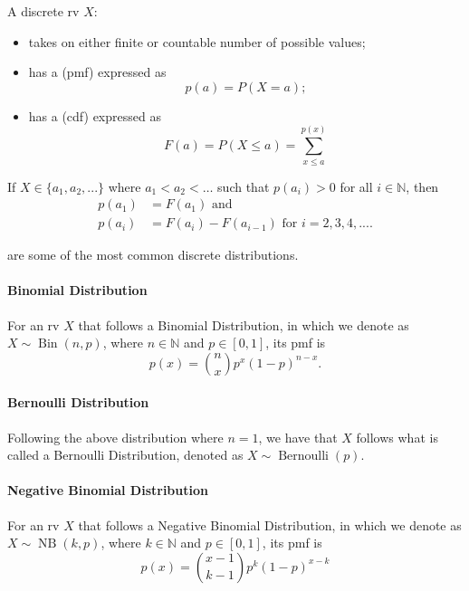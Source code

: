 \documentclass[notoc,notitlepage]{tufte-book}
\DeclareMathOperator{\Bernoulli}{Bernoulli }
\DeclareMathOperator{\Bin}{Bin }
\DeclareMathOperator{\NB}{NB }
\begin{document}

A discrete rv $X$:
\begin{itemize}
  \item takes on either finite or countable number of possible values;
  \item has a  (pmf) expressed as
    \begin{equation*}
      p(a) = P(X = a);
    \end{equation*}
  \item has a  (cdf) expressed as
    \begin{equation*}
      F(a) = P(X \leq a) = \sum_{x \leq a}^{p(x)} 
    \end{equation*}
\end{itemize}

\begin{note}
  If $X \in \{a_1, a_2, ...\}$ where $a_1 < a_2 < \hdots$ such that $p(a_i) > 0$ for all $i \in \mathbb{N}$, then
  \begin{align*}
    p(a_1) &= F(a_1) \text{ and } \\
    p(a_i) &= F(a_i) - F(a_{i - 1}) \text{ for } i = 2, 3, 4, ....
  \end{align*}
\end{note}

 are some of the most common discrete distributions.

\paragraph{Binomial Distribution} For an rv $X$ that follows a Binomial Distribution, in which we denote as $X \sim \Bin(n, p)$, where $n \in \mathbb{N}$ and $p \in [0, 1]$, its pmf is
\begin{equation*}
  p(x) = \binom{n}{x} p^x (1 - p)^{n - x}.
\end{equation*}

\paragraph{Bernoulli Distribution} Following the above distribution where $n = 1$, we have that $X$ follows what is called a Bernoulli Distribution, denoted as $X \sim \Bernoulli(p)$.

\paragraph{Negative Binomial Distribution} For an rv $X$ that follows a Negative Binomial Distribution, in which we denote as $X \sim \NB(k, p)$, where $k \in \mathbb{N}$ and $p \in [0, 1]$, its pmf is
\begin{equation*}
  p(x) = \binom{x - 1}{k - 1} p^k (1 - p)^{x - k}
\end{equation*}
\end{document}

